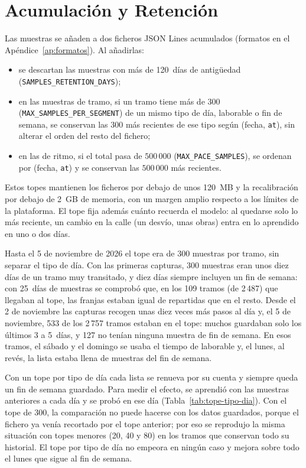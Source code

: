 \section{Acumulación y Retención}
\label{sec:retencion}

Las muestras se añaden a dos ficheros JSON Lines acumulados (formatos en el Apéndice~\ref{ap:formatos}). Al añadirlas:

\begin{itemize}
  \item se descartan las muestras con más de 120~días de antigüedad (\texttt{SAMPLES\_RETENTION\_DAYS});
  \item en las muestras de tramo, si un tramo tiene más de 300 (\texttt{MAX\_SAMPLES\_PER\_SEGMENT}) de un mismo tipo
        de día, laborable o fin de semana, se conservan las 300 más recientes de ese tipo según (fecha, \texttt{at}),
        sin alterar el orden del resto del fichero;
  \item en las de ritmo, si el total pasa de $500\,000$ (\texttt{MAX\_PACE\_SAMPLES}), se ordenan por (fecha,
        \texttt{at}) y se conservan las $500\,000$ más recientes.
\end{itemize}

\noindent Estos topes mantienen los ficheros por debajo de unos 120~MB y la recalibración por debajo de 2~GB de memoria,
con un margen amplio respecto a los límites de la plataforma. El tope fija además cuánto recuerda el modelo: al quedarse
solo lo más reciente, un cambio en la calle (un desvío, unas obras) entra en lo aprendido en uno o dos días.

Hasta el 5 de noviembre de 2026 el tope era de 300 muestras por tramo, sin separar el tipo de día. Con las primeras
capturas, 300 muestras eran unos diez días de un tramo muy transitado, y diez días siempre incluyen un fin de semana: con
25~días de muestras se comprobó que, en los 109 tramos (de 2\,487) que llegaban al tope, las franjas estaban igual de
repartidas que en el resto. Desde el 2 de noviembre las capturas recogen unas diez veces más pasos al día y, el 5 de
noviembre, 533 de los 2\,757 tramos estaban en el tope: muchos guardaban solo los últimos 3 a 5~días, y 127 no tenían ninguna muestra de
fin de semana. En esos tramos, el sábado y el domingo se usaba el tiempo de laborable y, el lunes, al revés, la lista
estaba llena de muestras del fin de semana.

Con un tope por tipo de día cada lista se renueva por su cuenta y siempre queda un fin de semana guardado. Para medir el
efecto, se aprendió con las muestras anteriores a cada día y se probó en ese día (Tabla~\ref{tab:tope-tipo-dia}). Con el
tope de 300, la comparación no puede hacerse con los datos guardados, porque el fichero ya venía recortado por el tope
anterior; por eso se reprodujo la misma situación con topes menores (20, 40 y 80) en los tramos que conservan todo su
historial. El tope por tipo de día no empeora en ningún caso y mejora sobre todo el lunes que sigue al fin de semana.

